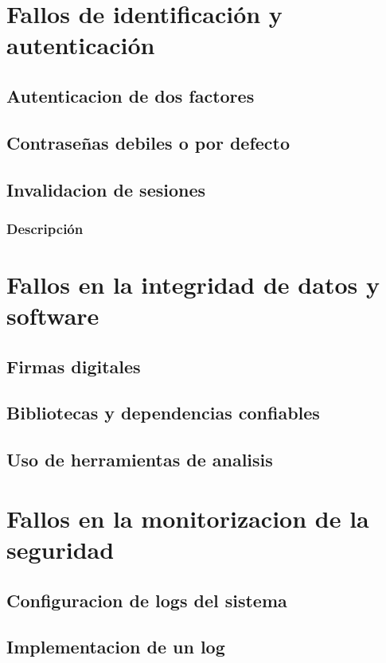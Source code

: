 \documentclass{report}
\begin{document}
        \section{Fallos de identificación y autenticación}
            \subsection{Autenticacion de dos factores}
            \clearpage
            \subsection{Contraseñas debiles o por defecto}
            \clearpage
            \subsection{Invalidacion de sesiones}
                    \subsubsection{Descripción}
            \clearpage
        \section{Fallos en la integridad de datos y software}
            \subsection{Firmas digitales}
            \clearpage
            \subsection{Bibliotecas y dependencias confiables}
            \clearpage
            \subsection{Uso de herramientas de analisis}
            \clearpage
        \section{Fallos en la monitorizacion de la seguridad}
            \subsection{Configuracion de logs del sistema}
            \clearpage
            \subsection{Implementacion de un log}
            \clearpage
\end{document}
